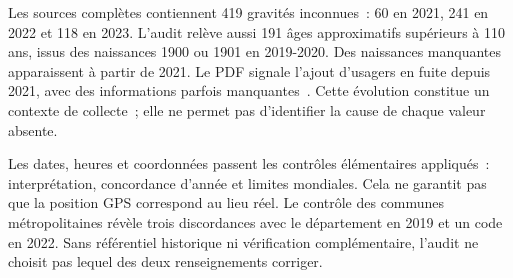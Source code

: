 Les sources complètes contiennent 419 gravités inconnues~: 60 en 2021, 241 en 2022 et
118 en 2023. L'audit relève aussi 191 âges approximatifs supérieurs à 110 ans, issus
des naissances 1900 ou 1901 en 2019-2020. Des naissances manquantes apparaissent à partir
de 2021. Le PDF signale l'ajout d'usagers en fuite depuis 2021, avec des informations
parfois manquantes~\cite{doc-onisr}. Cette évolution constitue un contexte de collecte~;
elle ne permet pas d'identifier la cause de chaque valeur absente.

Les dates, heures et coordonnées passent les contrôles élémentaires appliqués~:
interprétation, concordance d'année et limites mondiales. Cela ne garantit pas que la
position GPS correspond au lieu réel. Le contrôle des communes métropolitaines révèle
trois discordances avec le département en 2019 et un code  en 2022. Sans
référentiel historique ni vérification complémentaire, l'audit ne choisit pas lequel
des deux renseignements corriger.

\FloatBarrier
{}
